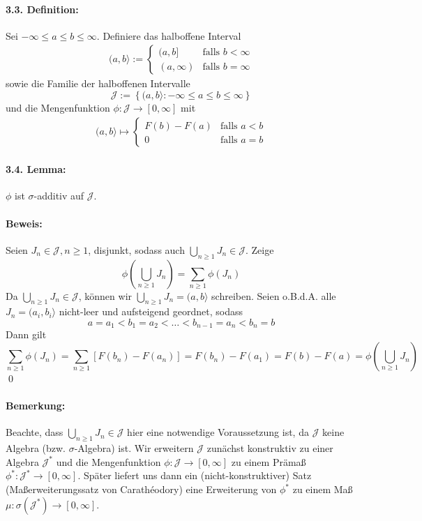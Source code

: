 \documentclass[12pt]{report}
\begin{document}
\paragraph{3.3. Definition:}Sei $-\infty\leq a\leq b\leq\infty$. Definiere das halboffene Interval
\begin{align*}
    (a,b\rangle:=
\begin{cases}
    (a,b] &\text{falls }b<\infty \\
    (a,\infty)&\text{falls }b=\infty
\end{cases}
\end{align*}
sowie die Familie der halboffenen Intervalle
$$\mathcal{J}:=\left\{(a,b\rangle:-\infty\leq a\leq b\leq\infty\right\}
$$
und die Mengenfunktion $\phi:\mathcal{J}\to[0,\infty]$ mit
\begin{align*}
    (a,b\rangle\mapsto
    \begin{cases}
        F(b)-F(a)&\text{falls }a<b\\
        0&\text{falls }a=b
    \end{cases}
\end{align*}

\paragraph{3.4. Lemma:}$\phi$ ist $\sigma$-additiv auf $\mathcal{J}$.

\paragraph{Beweis:}Seien $J_n\in\mathcal{J},n\geq1$, disjunkt, sodass auch $\bigcup_{n\geq1}J_n\in\mathcal{J}$. Zeige 
$$\phi\left(\bigcup_{n\geq1}J_n\right)=\sum_{n\geq1}\phi(J_n)$$
Da $\bigcup_{n\geq1}J_n\in\mathcal{J}$, k\"onnen wir $\bigcup_{n\geq1}J_n=(a,b\rangle$ schreiben. Seien o.B.d.A. alle $J_n=(a_i,b_i\rangle$ nicht-leer und aufsteigend geordnet, sodass
$$a=a_1<b_1=a_2<\hdots<b_{n-1}=a_n<b_n=b$$ 
Dann gilt 
$$\sum_{n\geq1}\phi(J_n)=\sum_{n\geq1}[F(b_n)-F(a_n)]=F(b_n)-F(a_1)=F(b)-F(a)=\phi\left(\bigcup_{n\geq1}J_n\right)$$
\qed

\paragraph{Bemerkung:}Beachte, dass $\bigcup_{n\geq1}J_n\in\mathcal{J}$ hier eine notwendige Voraussetzung ist, da $\mathcal{J}$ keine Algebra (bzw. $\sigma$-Algebra) ist. Wir erweitern $\mathcal{J}$ zun\"achst konstruktiv zu einer Algebra $\mathcal{J}^*$ und die Mengenfunktion $\phi:\mathcal{J}\to[0,\infty]$ zu einem Pr\"ama\ss{} $\phi^*:\mathcal{J}^*\to[0,\infty]$. Sp\"ater liefert uns dann ein (nicht-konstruktiver) Satz (Ma\ss{}erweiterungssatz von Carath\'eodory) eine Erweiterung von $\phi^*$ zu einem Ma\ss{} $\mu:\sigma(\mathcal{J}^*)\to[0,\infty]$.
\end{document}
